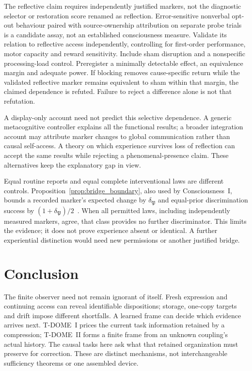 \documentclass[12pt]{article}
\theoremstyle{definition}
\theoremstyle{remark}
\begin{document}
The reflective claim requires independently justified markers,
not the diagnostic selector or restoration score renamed as reflection.
Error-sensitive nonverbal opt-out behaviour paired with source-ownership
attribution on separate probe trials is a candidate assay, not an
established consciousness measure.
Validate its relation to reflective access independently, controlling
for first-order performance, motor capacity and reward sensitivity.
Include sham disruption and a nonspecific processing-load control.
Preregister a minimally detectable effect, an equivalence margin
and adequate power. If blocking removes cause-specific return while
the validated reflective marker remains equivalent to sham within
that margin, the claimed dependence is refuted. Failure to reject
a difference alone is not that refutation.

A display-only account need not predict this selective dependence.
A generic metacognitive controller explains all the functional
results; a broader integration account may attribute marker changes
to global communication rather than causal self-access.
A theory on which experience survives loss of reflection can accept
the same results while rejecting a phenomenal-presence claim.
These alternatives keep the explanatory gap in view.

Equal routine reports and equal complete interventional laws are
different controls. Proposition~\ref{prop:bridge_boundary}, also used
by Consciousness~I, bounds a recorded marker's expected change by
$\delta_{\mathfrak P}$ and equal-prior discrimination success by
$(1+\delta_{\mathfrak P})/2$~\cite{PaperI}.
When all permitted laws, including independently measured markers,
agree, that class provides no further discriminator.
This limits the evidence; it does not prove experience absent or
identical. A further experiential distinction would need new
permissions or another justified bridge.

\section{Conclusion}\label{sec:8}

The finite observer need not remain ignorant of itself.
Fresh expression and continuing access can reveal identifiable
dispositions; storage, one-copy targets and drift impose different
shortfalls. A learned frame can decide which evidence arrives next.
T-DOME~I prices the current task information retained by a compression;
T-DOME~II forms a finite frame from an unknown coupling's actual
history. The causal tasks here ask what that retained organization
must preserve for correction. These are distinct mechanisms, not
interchangeable sufficiency theorems or one assembled device.
\end{document}
